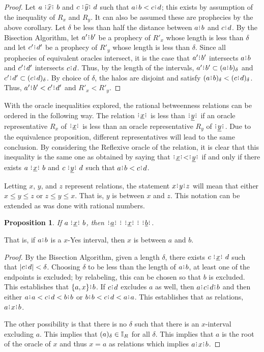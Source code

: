 \documentclass[12pt]{article}
\newtheorem{proposition}{Proposition}[section]
\begin{document}
\begin{proof}
    Let $a \xora b$ and $c \xora[y] d$ such that $a\rint b < c\rint d$; this exists by assumption of the inequality of $R_x$ and $R_y$. It can also be assumed these are prophecies by the above corollary. Let $\delta$ be less than half the distance between $a\rint b$ and $c\rint d$. By the Bisection Algorithm, let $a'\rint b'$ be a prophecy of $R'_x$ whose length is less than $\delta$ and let $c'\rint d'$ be a prophecy of $R'_y$ whose length is less than $\delta$. Since all prophecies of equivalent oracles intersect, it is the case that $a'\rint b'$ intersects $a\rint b$ and $c'\rint d'$ intersects $c\rint d$. Thus, by the length of the intervals, $a'\rint b' \subset \halo{a\rint b}$ and $c'\rint d' \subset \halo{c\rint d}$. By choice of $\delta$, the halos are disjoint and satisfy $\halo{a\rint b} < \halo{c\rint d}$. Thus, $a'\rint b' < c'\rint d'$ and 
    $R'_{x} < R'_{y}$.
\end{proof}

With the oracle inequalities explored, the rational betweenness relations can be ordered in the following way. The relation $\xrel$ is less than $\xrel[y]$ if an oracle representative $R_x$ of $\xrel$ is less than an oracle representative $R_y$ of $\xrel[y]$. Due to the equivalence proposition, different representatives will lead to the same conclusion. By considering the Reflexive oracle of the relation, it is clear that this inequality is the same one as obtained by saying that $\xrel < \xrel[y]$ if and only if there exists $a \xrel b$ and $c \xrel[y] d$ such that $a\rint b < c\rint d$. 

Letting $x$, $y$, and $z$ represent relations, the statement $x\rint y\rint z$ will mean that either $x \leq y \leq z$ or $z \leq y \leq x$. That is, $y$ is between $x$ and $z$. This notation can be extended as was done with rational numbers. 

\begin{proposition}
    If $a \xrel b$, then $\xrel[a] \rint  \xrel \rint  \xrel[b]$.
\end{proposition}

That is, if $a\rint b$ is a $x$-Yes interval, then $x$ is between $a$ and $b$.

\begin{proof}
    By the Bisection Algorithm, given a length $\delta$, there exists $c \xrel d$ such that $|c\rint d|<\delta$. Choosing $\delta$ to be less than the length of $a\rint b$, at least one of the endpoints is excluded; by relabeling, this can be chosen so that $b$ is excluded. This establishes that $\{a, x\} \rint  b$. If $c\rint d$ excludes $a$ as well, then $a \rint  c\rint d\rint b$ and then either $a\rint a < c\rint d < b\rint b$ or $b\rint b < c\rint d < a\rint a$. This establishes that as relations, $a \rint  x \rint  b$. 

    The other possibility is that there is no $\delta$ such that there is an $x$-interval excluding $a$. This implies that $(a)_{\delta} \in \mathbb{I}_R$ for all $\delta$. This implies that $a$ is the root of the oracle of $x$ and thus $x = a$ as relations which implies $a\rint x\rint b$. 
\end{proof}
\end{document}
